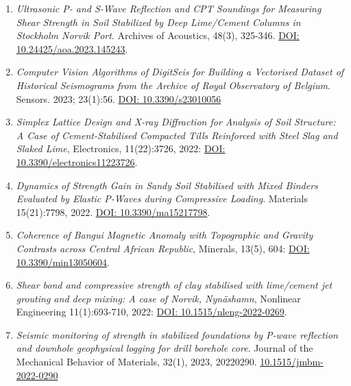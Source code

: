 \documentclass[pdflatex,compress,8pt,
	xcolor={dvipsnames,dvipsnames,svgnames,x11names,table},
	hyperref={colorlinks = true,breaklinks = true, urlcolor = NavyBlue, breaklinks = true}]{beamer}
\begin{document}
\begin{frame}
\begin{examples}{}
\tiny{
\begin{enumerate}
	\item \emph{Ultrasonic P- and S-Wave Reflection and CPT Soundings for Measuring Shear Strength in Soil Stabilized by Deep Lime/Cement Columns in Stockholm Norvik Port}. Archives of Acoustics, 48(3), 325-346. \href{https://doi.org/10.24425/aoa.2023.145243}{DOI: 10.24425/aoa.2023.145243}.
	\item \emph{Computer Vision Algorithms of DigitSeis for Building a Vectorised Dataset of Historical Seismograms from the Archive of Royal Observatory of Belgium}. Sensors. 2023; 23(1):56. \href{https://doi.org/10.3390/s23010056}{DOI: 10.3390/s23010056}	
	\item \emph{Simplex Lattice Design and X-ray Diffraction for Analysis of Soil Structure: A Case of Cement-Stabilised Compacted Tills Reinforced with Steel Slag and Slaked Lime}, Electronics, 11(22):3726, 2022: \href{https://doi.org/10.3390/electronics11223726}{DOI: 10.3390/electronics11223726}.
	\item \emph{Dynamics of Strength Gain in Sandy Soil Stabilised with Mixed Binders Evaluated by Elastic P-Waves during Compressive Loading}. Materials 15(21):7798, 2022. \href{https://doi.org/10.3390/ma15217798}{DOI: 10.3390/ma15217798}.
	\item \emph{Coherence of Bangui Magnetic Anomaly with Topographic and Gravity Contrasts across Central African Republic}, Minerals, 13(5), 604: \href{https://doi.org/10.3390/min13050604}{DOI: 10.3390/min13050604}.
	\item \emph{Shear bond and compressive strength of clay stabilised with lime/cement jet grouting and deep mixing: A case of Norvik, Nynäshamn}, Nonlinear Engineering 11(1):693-710, 2022: \href{https://doi.org/10.1515/nleng-2022-0269}{DOI: 10.1515/nleng-2022-0269}.
	\item \emph{Seismic monitoring of strength in stabilized foundations by P-wave reflection and downhole geophysical logging for drill borehole core}. Journal of the Mechanical Behavior of Materials, 32(1), 2023, 20220290. \href{https://doi.org/10.1515/jmbm-2022-0290}{10.1515/jmbm-2022-0290}

\end{enumerate}
}
\end{examples}
\end{frame}
\end{document}
